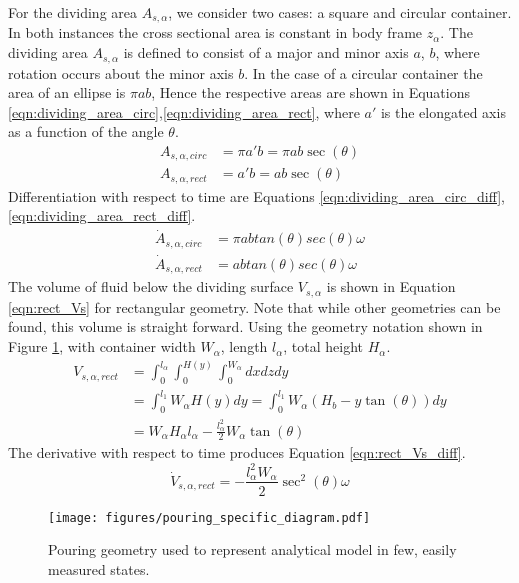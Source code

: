 For the dividing area $A_{s,\alpha}$, we consider two cases: a square and circular container. In both instances the cross sectional area is constant in body frame $z_{\alpha}$. The dividing area $A_{s,\alpha}$ is defined to consist of a major and minor axis $a$, $b$, where rotation occurs about the minor axis $b$. In the case of a circular container the area of an ellipse is $\pi ab$, Hence the respective areas are shown in Equations \eqref{eqn:dividing_area_circ},\eqref{eqn:dividing_area_rect}, where $a'$ is the elongated axis as a function of the angle $\theta$.
\begin{align}
A_{s,\alpha,circ} &= \pi a' b = \pi a b \sec(\theta)  \label{eqn:dividing_area_circ} \\
A_{s,\alpha,rect} &= a' b = a b \sec(\theta) \label{eqn:dividing_area_rect}
\end{align}
Differentiation with respect to time are Equations \eqref{eqn:dividing_area_circ_diff}, \eqref{eqn:dividing_area_rect_diff}.
\begin{align}
\dot{A}_{s,\alpha,circ} &= \pi a b tan(\theta) sec(\theta) \omega \label{eqn:dividing_area_circ_diff} \\
\dot{A}_{s,\alpha,rect} &=  a b tan(\theta) sec(\theta) \label{eqn:dividing_area_rect_diff} \omega
\end{align}
The volume of fluid below the dividing surface $V_{s,\alpha}$ is shown in Equation \eqref{eqn:rect_Vs} for rectangular geometry. Note that while other geometries can be found, this volume is straight forward. Using the geometry notation shown in Figure \ref{fig:specific_diagram}, with container width $W_{\alpha}$, length $l_{\alpha}$, total height $H_{\alpha}$. 
\begin{align}
V_{s,\alpha,rect} &= \int_0^{l_{\alpha}} \int_0^{H(y)} \int_0^{W_{\alpha}} dx dz dy \nonumber \\
&= \int_0^{l_1}  W_{\alpha} H(y) dy = \int_0^{l_1}  W_{\alpha} (H_b - y \tan(\theta))  dy  \nonumber \\
&= W_{\alpha} H_{\alpha} l_{\alpha} -\frac{l_{\alpha}^2}{2} W_{\alpha} \tan(\theta)  \label{eqn:rect_Vs}
\end{align}
The derivative with respect to time produces Equation \eqref{eqn:rect_Vs_diff}.
\begin{equation}
\dot{V}_{s,\alpha,rect} = - \frac{l_{\alpha}^2 W_{\alpha}}{2} \sec^2(
\theta) \omega \label{eqn:rect_Vs_diff}
\end{equation}

\begin{figure}[h]
\centering
\texttt{[image: figures/pouring\_specific\_diagram.pdf]}
\caption{Pouring geometry used to represent analytical model in few, easily measured states.}
\label{fig:specific_diagram}
\end{figure}

